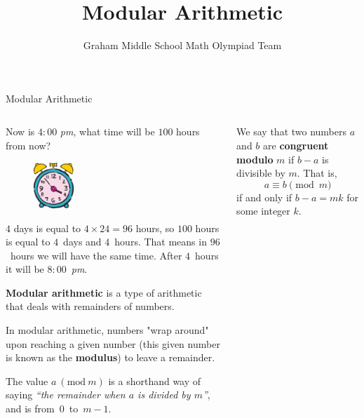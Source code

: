 \documentclass[9pt,aspectratio=169]{beamer}
\title{Modular Arithmetic}
\subtitle[Graham Middle School]{Graham Middle School Math Olympiad Team}
\newcommand{\Mod}[1]{\ (\mathrm{mod}\ #1)}
\begin{document}
\maketitle

\begin{frame}{Modular Arithmetic}
  \begin{columns}[T]
    \begin{column}{0.5\textwidth}
      \begin{problem}
        Now is $4{:}00$ \emph{pm}, what time will be $100$ hours from now? 
      \end{problem}

      \begin{figure}\centering
        \vspace*{-1.3ex}
        \includegraphics[width=0.25\textwidth]{01 - Modular arithmetic/clocks.png}
      \end{figure}

      $4$ days is equal to $4 \times 24 = 96$ hours, so $100$ hours is equal to $4$~days and $4$~hours. That means in $96$~hours we will have the same time. After $4$~hours it will be $8{:}00$~\emph{pm}.\medskip

      \begin{definition}
        \textbf{Modular arithmetic} is a type of arithmetic that deals with remainders of numbers.
      \end{definition}
      
      In modular arithmetic, numbers "wrap around" upon reaching a given number (this given number is known as the \textbf{modulus}) to leave a remainder.

      \begin{definition}
        The value $a \Mod{m}$ is a shorthand way of saying \emph{“the remainder when $a$ is divided by $m$”}, and is from~$0$~to~$m-1$.
      \end{definition}
    \end{column}
    \begin{column}{0.5\textwidth}
      \begin{definition}
        We say that two numbers $a$ and $b$ are \textbf{congruent modulo} $m$ if $b−a$ is
        divisible by $m$. That is,
        \[ a \equiv b \pmod{m} \]
        if and only if $b−a=mk$ for some integer $k$.
      \end{definition}


\end{column}
\end{columns}
\end{frame}
\end{document}
